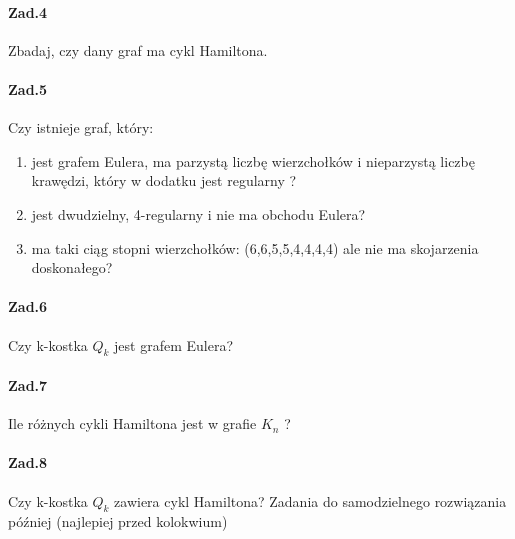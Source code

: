 \paragraph{Zad.4} Zbadaj, czy dany graf ma cykl Hamiltona.

\paragraph{Zad.5} Czy istnieje graf, który:
\begin{enumerate}[label=\alph*)]
\item jest grafem Eulera, ma parzystą liczbę wierzchołków i nieparzystą liczbę krawędzi, który w dodatku jest regularny ?
\item jest dwudzielny, 4-regularny i nie ma obchodu Eulera?
\item ma taki ciąg stopni wierzchołków: (6,6,5,5,4,4,4,4) ale nie ma skojarzenia doskonałego?
\end{enumerate}

\paragraph{Zad.6} Czy k-kostka $Q_k$ jest grafem Eulera?

\paragraph{Zad.7} Ile różnych cykli Hamiltona jest w grafie $K_n$ ?

\paragraph{Zad.8} Czy k-kostka $Q_k$ zawiera cykl Hamiltona? Zadania do samodzielnego rozwiązania później (najlepiej przed kolokwium)


